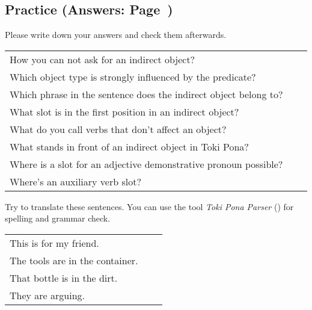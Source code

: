 %
\newpage
%
\subsection*{Practice (Answers: Page~\pageref{'indirect_objects'})}
%
Please write down your answers and check them afterwards. 

\begin{supertabular}{p{5,5cm}|ll}
How you can not ask for an indirect object? &&  \\ %
Which object type is strongly influenced by the predicate? &&   \\ %
Which phrase in the sentence does the indirect object belong to? &&  \\ %
What slot is in the first position in an indirect object? &&  \\ %
What do you call verbs that don't affect an object? &&  \\ %
What stands in front of an indirect object in Toki Pona? &&  \\ %
Where is a slot for an adjective demonstrative pronoun possible? &&  \\ %
Where's an auxiliary verb slot? &&  \\ %
\end{supertabular}

Try to translate these sentences. 
You can use the tool \textit{Toki Pona Parser} (\cite{www:rowa:02}) for spelling and grammar check. 

\begin{supertabular}{p{5,5cm}|ll}
This is for my friend.  &&  \\ %
The tools are in the container.  && \\ %
That bottle is in the dirt.  &&  \\ %
They are arguing. &&  \\ %
\end{supertabular} 

%
